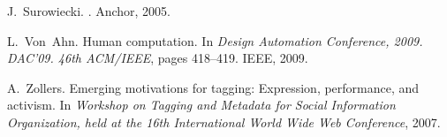\documentclass{www13-companion-accepted}
\begin{document}
\begin{thebibliography}{10}
J.~Surowiecki.
.
\newblock Anchor, 2005.

\vfill\eject

L.~Von~Ahn.
\newblock Human computation.
\newblock In {\em Design Automation Conference, 2009. DAC'09. 46th ACM/IEEE},
  pages 418--419. IEEE, 2009.

A.~Zollers.
\newblock Emerging motivations for tagging: Expression, performance, and
  activism.
\newblock In {\em Workshop on Tagging and Metadata for Social Information
  Organization, held at the 16th International World Wide Web Conference},
  2007.

\end{thebibliography}






\balancecolumns %
\end{document}
